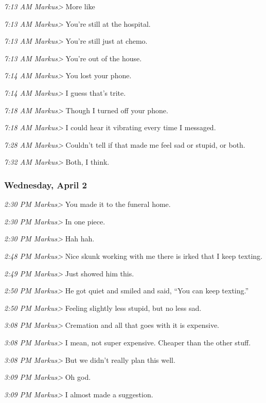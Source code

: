 {\emph{7:13 AM Markus\textgreater{}} More like

\emph{7:13 AM Markus\textgreater{}} You're still at the hospital.

\emph{7:13 AM Markus\textgreater{}} You're still just at chemo.

\emph{7:13 AM Markus\textgreater{}} You're out of the house.

\emph{7:14 AM Markus\textgreater{}} You lost your phone.

\emph{7:14 AM Markus\textgreater{}} I guess that's trite.

\emph{7:18 AM Markus\textgreater{}} Though I turned off your phone.

\emph{7:18 AM Markus\textgreater{}} I could hear it vibrating every time
I messaged.

\emph{7:28 AM Markus\textgreater{}} Couldn't tell if that made me feel
sad or stupid, or both.

\emph{7:32 AM Markus\textgreater{}} Both, I think.

\subsubsection*{Wednesday, April 2}\label{wednesday-april-2}

\emph{2:30 PM Markus\textgreater{}} You made it to the funeral home.

\emph{2:30 PM Markus\textgreater{}} In one piece.

\emph{2:30 PM Markus\textgreater{}} Hah hah.

\emph{2:48 PM Markus\textgreater{}} Nice skunk working with me there is
irked that I keep texting.

\emph{2:49 PM Markus\textgreater{}} Just showed him this.

\emph{2:50 PM Markus\textgreater{}} He got quiet and smiled and said,
``You can keep texting.''

\emph{2:50 PM Markus\textgreater{}} Feeling slightly less stupid, but no
less sad.

\emph{3:08 PM Markus\textgreater{}} Cremation and all that goes with it
is expensive.

\emph{3:08 PM Markus\textgreater{}} I mean, not super expensive. Cheaper
than the other stuff.

\emph{3:08 PM Markus\textgreater{}} But we didn't really plan this well.

\emph{3:09 PM Markus\textgreater{}} Oh god.

\emph{3:09 PM Markus\textgreater{}} I almost made a suggestion.

}
